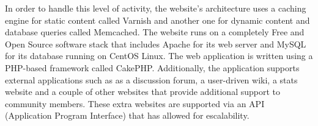 In order to handle this level of activity, the website's architecture uses a caching engine for static content called Varnish and another one for dynamic content and database queries called Memcached. 
The website runs on a completely Free and Open Source software stack that includes Apache for its web server and MySQL for its database running on CentOS Linux. 
The web application is written using a PHP-based framework called CakePHP.
Additionally, the application supports external applications such as as a discussion forum, a user-driven wiki, a stats website and a couple of other websites that provide additional support to community members. 
These extra websites are supported via an API (Application Program Interface) that has allowed for escalability.
